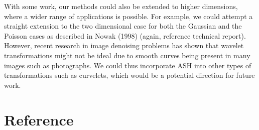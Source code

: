 \documentclass[12pt]{article}
\begin{document}
With some work, our methods could also be extended to higher dimensions, where a wider range of applications is possible. For example, we could attempt a straight extension to the two dimensional case for both the Gaussian and the Poisson cases as described in Nowak (1998) (again, reference technical report). However, recent research in image denoising problems has shown that wavelet transformations might not be ideal due to smooth curves being present in many images such as photographs. We could thus incorporate ASH into other types of transformations such as curvelets, which would be a potential direction for future work.
\newpage
\section{Reference}

\begin{appendices}

\end{appendices}
\end{document}
